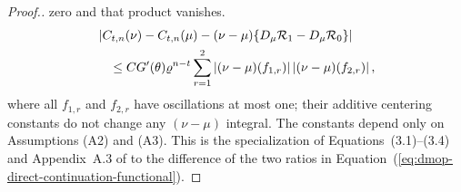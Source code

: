 \documentclass[11pt]{article}
\newcommand\refAssumpBoundedProcess{(A2)} %
\newcommand\refAssumpBoundedMeasurement{(A3)} %
\theoremstyle{thmstylethree}%
\begin{document}
\begin{proof}[Proof.]
zero and that product vanishes.
\begin{align}
&\left|
C_{t,n}(\nu)-C_{t,n}(\mu)
-(\nu-\mu)
\{D_\mu\mathcal R_1-D_\mu\mathcal R_0\}
\right|                                                     \notag\\
&\quad\leq
CG'(\theta)\varrho^{n-t}
\sum_{r=1}^{2}
\left| (\nu-\mu)(f_{1,r})\right|
\left| (\nu-\mu)(f_{2,r})\right|,
\label{eq:dmop-direct-local-quadratic-remainder}
\end{align}
where all $f_{1,r}$ and $f_{2,r}$ have
oscillations at most one; their additive centering constants do not
change any $(\nu-\mu)$ integral.  The constants depend only on Assumptions
{\refAssumpBoundedProcess} and {\refAssumpBoundedMeasurement}.
This is the specialization of Equations~(3.1)--(3.4) and
Appendix~A.3 of \citet{delMoral11} to the difference of the two ratios
in Equation~(\ref{eq:dmop-direct-continuation-functional}).


\end{proof}
\end{document}
